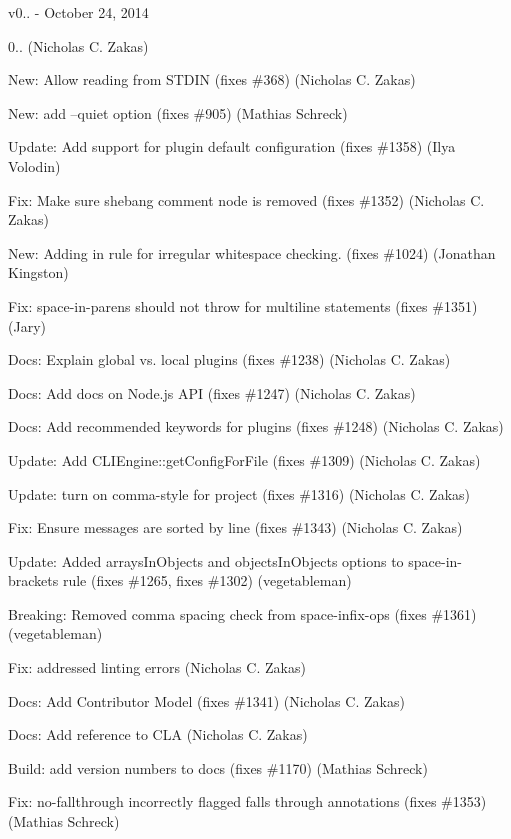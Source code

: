 v0.. -\/ October 24, 2014


\begin{DoxyItemize}
\item 0.. (Nicholas C. Zakas)
\item New\+: Allow reading from S\+T\+D\+IN (fixes \#368) (Nicholas C. Zakas)
\item New\+: add --quiet option (fixes \#905) (Mathias Schreck)
\item Update\+: Add support for plugin default configuration (fixes \#1358) (Ilya Volodin)
\item Fix\+: Make sure shebang comment node is removed (fixes \#1352) (Nicholas C. Zakas)
\item New\+: Adding in rule for irregular whitespace checking. (fixes \#1024) (Jonathan Kingston)
\item Fix\+: space-\/in-\/parens should not throw for multiline statements (fixes \#1351) (Jary)
\item Docs\+: Explain global vs. local plugins (fixes \#1238) (Nicholas C. Zakas)
\item Docs\+: Add docs on Node.\+js A\+PI (fixes \#1247) (Nicholas C. Zakas)
\item Docs\+: Add recommended keywords for plugins (fixes \#1248) (Nicholas C. Zakas)
\item Update\+: Add C\+L\+I\+Engine\+::get\+Config\+For\+File (fixes \#1309) (Nicholas C. Zakas)
\item Update\+: turn on comma-\/style for project (fixes \#1316) (Nicholas C. Zakas)
\item Fix\+: Ensure messages are sorted by line (fixes \#1343) (Nicholas C. Zakas)
\item Update\+: Added arrays\+In\+Objects and objects\+In\+Objects options to space-\/in-\/brackets rule (fixes \#1265, fixes \#1302) (vegetableman)
\item Breaking\+: Removed comma spacing check from space-\/infix-\/ops (fixes \#1361) (vegetableman)
\item Fix\+: addressed linting errors (Nicholas C. Zakas)
\item Docs\+: Add Contributor Model (fixes \#1341) (Nicholas C. Zakas)
\item Docs\+: Add reference to C\+LA (Nicholas C. Zakas)
\item Build\+: add version numbers to docs (fixes \#1170) (Mathias Schreck)
\item Fix\+: no-\/fallthrough incorrectly flagged falls through annotations (fixes \#1353) (Mathias Schreck)

\end{DoxyItemize}
